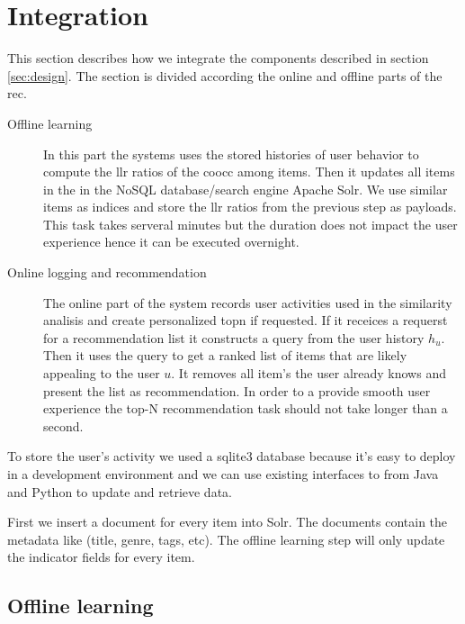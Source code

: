 \section{Integration}
\label{sec:integration}

This section describes how we integrate the components described in section \ref{sec:design}. The section is divided according the online and offline parts of the \gls{rec}.

\begin{description}
\item[Offline learning] In this part the systems uses the stored histories of user behavior to compute the \gls{llr} ratios of the \gls{coocc} among items. Then it updates all items in the in the NoSQL database/search engine Apache Solr. We use similar items as indices and store the \gls{llr} ratios from the previous step as payloads. This task takes serveral minutes but the duration does not impact the user experience hence it can be executed overnight. 
\item[Online logging and recommendation] The online part of the system records user activities used in the similarity analisis and create personalized \gls{topn} if requested. If it receices a requerst for a recommendation list it constructs a query from the user history $h_u$. Then it uses the query to get a ranked list of items that are likely appealing to the user $u$. It removes all item's the user already knows and present the list as recommendation. In order to a  provide smooth user experience the top-N recommendation task should not take longer than a second.
\end{description}

To store the user's activity we used a sqlite3 database because it's easy to deploy in a development environment and we can use existing interfaces to from Java and Python to update and retrieve data. 

First we insert a document for every item into Solr. The documents contain the metadata like (title, genre, tags, etc). The offline learning step will only update the indicator fields for every item.

\subsection{Offline learning}
\label{sec:offline}

